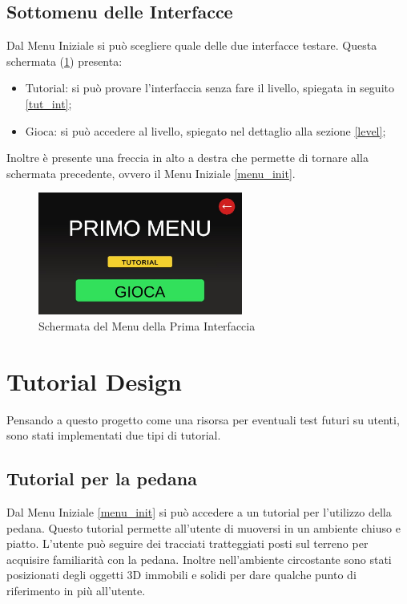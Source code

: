 \documentclass[target=bach,aauheader=]{thud}
\begin{document}
\subsection{Sottomenu delle Interfacce}
\label{menu_int}
Dal Menu Iniziale si può scegliere quale delle due interfacce testare.
Questa schermata (\ref{fig:first_menu}) presenta:
\begin{itemize}
    \item Tutorial: si può provare l'interfaccia senza fare il livello, spiegata in seguito \ref{tut_int};
    \item Gioca: si può accedere al livello, spiegato nel dettaglio alla sezione \ref{level};
\end{itemize}
Inoltre è presente una freccia in alto a destra che permette di tornare alla schermata precedente, ovvero il Menu Iniziale \ref{menu_init}.

\begin{figure}[h]
    \centering
    \includegraphics[width=0.60\textwidth]{first_menu}
    \caption{Schermata del Menu della Prima Interfaccia}
    \label{fig:first_menu}
\end{figure}

\section{Tutorial Design}
Pensando a questo progetto come una risorsa per eventuali test futuri su utenti, sono stati implementati due tipi di tutorial.

\subsection{Tutorial per la pedana}
\label{tut_ped}
Dal Menu Iniziale \ref{menu_init} si può accedere a un tutorial per l'utilizzo della pedana.
Questo tutorial permette all'utente di muoversi in un ambiente chiuso e piatto.
L'utente può seguire dei tracciati tratteggiati posti sul terreno per acquisire familiarità con la pedana.
Inoltre nell'ambiente circostante sono stati posizionati degli oggetti 3D immobili e solidi per dare qualche punto di riferimento in più all'utente. 
\end{document}
